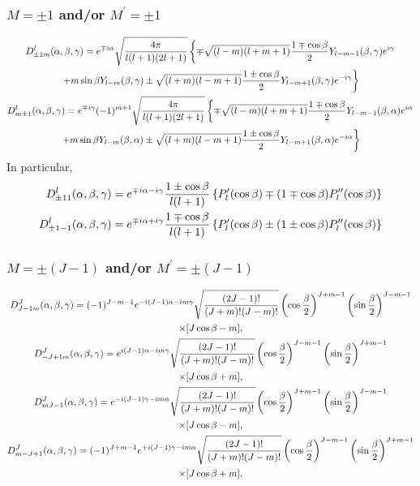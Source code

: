 \subsubsection{ $M= \pm 1$ and/or $M^{\prime}= \pm 1$}
\begin{gather}
D_{ \pm 1 m}^{l}(\alpha, \beta, \gamma)=e^{\mp i \alpha} \sqrt{\frac{4 \pi}{l(l+1)(2 l+1)}}\left\{\mp \sqrt{(l-m)(l+m+1)} \frac{1 \mp \cos \beta}{2} Y_{l-m-1}(\beta, \gamma) e^{i \gamma}\right.  \notag\\
\left.+m \sin \beta Y_{l-m}(\beta, \gamma) \pm \sqrt{(l+m)(l-m+1)} \frac{1 \pm \cos \beta}{2} Y_{l-m+1}(\beta, \gamma) e^{-i \gamma}\right\}  \notag\\
D_{m \pm 1}^{l}(\alpha, \beta, \gamma)=e^{\mp i \gamma}(-1)^{m+1} \sqrt{\frac{4 \pi}{l(l+1)(2 l+1)}}\left\{\mp \sqrt{(l-m)(l+m+1)} \frac{1 \mp \cos \beta}{2} Y_{l-m-1}(\beta, \alpha) e^{i \alpha}\right.  \label{eq:4:17:5}\\
\left.+m \sin \beta Y_{l-m}(\beta, \alpha) \pm \sqrt{(l+m)(l-m+1)} \frac{1 \pm \cos \beta}{2} Y_{l-m+1}(\beta, \alpha) e^{-i \alpha}\right\} \notag
\end{gather}
In particular,
\begin{align}
D_{ \pm 11}^{l}(\alpha, \beta, \gamma) & =e^{\mp i \alpha-i \gamma} \frac{1 \pm \cos \beta}{l(l+1)}\left\{P_{l}^{\prime}(\cos \beta) \mp(1 \mp \cos \beta) P_{l}^{\prime \prime}(\cos \beta)\right\}  \notag\\
D_{ \pm 1-1}^{l}(\alpha, \beta, \gamma) & =e^{\mp i \alpha+i \gamma} \frac{1 \mp \cos \beta}{l(l+1)}\left\{P_{l}^{\prime}(\cos \beta) \pm(1 \pm \cos \beta) P_{l}^{\prime \prime}(\cos \beta)\right\} \label{eq:4:17:6}
\end{align}
\subsubsection{ $M= \pm(J-1)$ and/or $M^{\prime}= \pm(J-1)$}
\begin{gather}
D_{J-1 m}^{J}(\alpha, \beta, \gamma)=(-1)^{J-m-1} e^{-i(J-1) \alpha-i m \gamma} \sqrt{\frac{(2 J-1)!}{(J+m)!(J-m)!}}\left(\cos \frac{\beta}{2}\right)^{J+m-1}\left(\sin \frac{\beta}{2}\right)^{J-m-1}  \notag\\
\times[J \cos \beta-m],  \notag\\
D_{-J+1 m}^{J}(\alpha, \beta, \gamma)=e^{i(J-1) \alpha-i m \gamma} \sqrt{\frac{(2 J-1)!}{(J+m)!(J-m)!}}\left(\cos \frac{\beta}{2}\right)^{J-m-1}\left(\sin \frac{\beta}{2}\right)^{J+m-1}  \notag\\
\times[J \cos \beta+m],  \notag\\
D_{m J-1}^{J}(\alpha, \beta, \gamma)=e^{-i(J-1) \gamma-i m \alpha} \sqrt{\frac{(2 J-1)!}{(J+m)!(J-m)!}}\left(\cos \frac{\beta}{2}\right)^{J+m-1}\left(\sin \frac{\beta}{2}\right)^{J-m-1}  \label{eq:4:17:7}\\
\times[J \cos \beta-m],  \notag\\
D_{m-J+1}^{J}(\alpha, \beta, \gamma)=(-1)^{J+m-1} e^{+i(J-1) \gamma-i m \alpha} \sqrt{\frac{(2 J-1)!}{(J+m)!(J-m)!}}\left(\cos \frac{\beta}{2}\right)^{J-m-1}\left(\sin \frac{\beta}{2}\right)^{J+m-1}  \notag\\
\times[J \cos \beta+m] . \notag
\end{gather}
